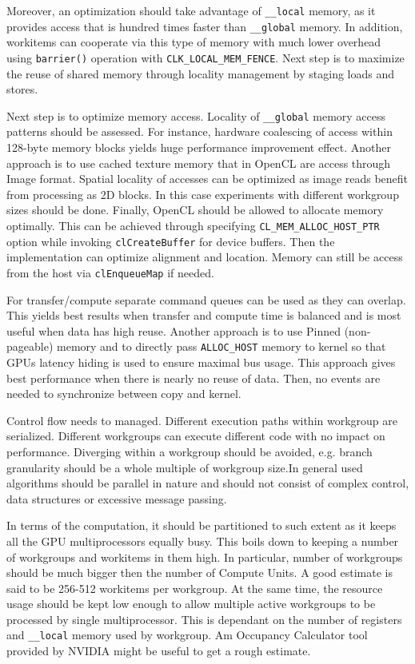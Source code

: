 Moreover, an optimization should take advantage of \texttt{\_\_local} memory, as it provides access that is hundred times faster than \texttt{\_\_global} memory. In addition, workitems can cooperate via this type of memory with much lower overhead using \texttt{barrier()} operation with \texttt{CLK\_LOCAL\_MEM\_FENCE}. Next step is to maximize the reuse of shared memory through locality management by staging loads and stores.

Next step is to optimize memory access. Locality of \texttt{\_\_global} memory access patterns should be assessed. For instance, hardware coalescing of access within 128-byte memory blocks yields huge performance improvement effect. Another approach is to use cached texture memory that in OpenCL are access through Image format. Spatial locality of accesses can be optimized as image reads benefit from processing as 2D blocks. In this case experiments with different workgroup sizes should be done. Finally, OpenCL should be allowed to allocate memory optimally. This can be achieved through specifying \texttt{CL\_MEM\_ALLOC\_HOST\_PTR} option while invoking \texttt{clCreateBuffer} for device buffers. Then the implementation can optimize alignment and location. Memory can still be access from the host via \texttt{clEnqueueMap} if needed.

For transfer/compute separate command queues can be used as they can overlap. This yields best results when transfer and compute time is balanced and is most useful when data has high reuse. Another approach is to use Pinned (non-pageable) memory and to directly pass \texttt{ALLOC\_HOST} memory to kernel so that GPUs latency hiding is used to ensure maximal bus usage. This approach gives best performance when there is nearly no reuse of data. Then, no events are needed to synchronize between copy and kernel.

Control flow needs to managed. Different execution paths within workgroup are serialized. Different workgroups can execute different code with no impact on performance. Diverging within a workgroup should be avoided, e.g. branch granularity should be a whole multiple of workgroup size.In general used algorithms should be parallel in nature and should not consist of complex control, data structures or excessive message passing.

In terms of the computation, it should be partitioned to such extent as it keeps all the GPU multiprocessors equally busy. This boils down to keeping a number of workgroups and workitems in them high. In particular, number of workgroups should be much bigger then the number of Compute Units. A good estimate is said to be 256-512 workitems per workgroup. At the same time, the resource usage should be kept low enough to allow multiple active workgroups to be processed by single multiprocessor. This is dependant on the number of registers and \texttt{\_\_local} memory used by workgroup. Am Occupancy Calculator tool provided by NVIDIA might be useful to get a rough estimate.

